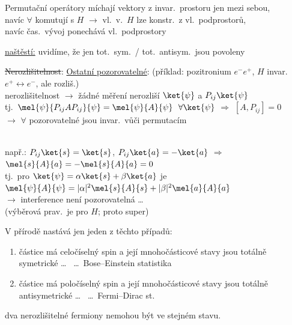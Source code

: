 Permutační operátory míchají vektory z invar.\ prostoru jen mezi sebou, \\
navíc $\forall$ komutují s $H$ \quad $\to$ vl.\ v.\ $H$ lze konstr.\ z vl.\ podprostorů, \\
\hspace*{5.5cm} navíc čas.\ vývoj ponechává vl.\ podprostory

\underline{naštěstí:} uvidíme, že jen tot.\ sym.\ / tot.\ antisym.\ jsou povoleny

\sout{Nerozlišitelnost}: \underline{Ostatní pozorovatelné}: \quad
(příklad: pozitronium $e^-e^+$, $H$ invar.\ $e^+\leftrightarrow e^-$, ale rozliš.) \\
nerozlišitelnost $\to$ žádné měření nerozliší $\ket{\psi}$ a $P_{ij}\ket{\psi}$ \\
\quad tj.\ \quad $\mel{\psi}{P_{ij}AP_{ij}}{\psi} = \mel{\psi}{A}{\psi}\ \ \forall\ket{\psi}$ \quad $\Rightarrow$ \quad $[A,P_{ij}] = 0$ \\
$\to$ $\forall$ pozorovatelné jsou invar.\ vůči permutacím

 \\
např.: \quad $P_{ij}\ket{s} = \ket{s}$, \quad $P_{ij}\ket{a} = -\ket{a}$ \quad $\Rightarrow$ \quad $\mel{s}{A}{a} = -\mel{s}{A}{a} = 0$ \\
\quad tj.\ pro $\ket{\psi} = \alpha\ket{s} + \beta\ket{a}$ je $\mel{\psi}{A}{\psi} = |\alpha|^2\mel{s}{A}{s} + |\beta|^2\mel{a}{A}{a}$ \\
$\to$ interference není pozorovatelná \quad \dots\  \\
\hspace*{6cm} (výběrová prav.\ je pro $H$; proto super)

\begin{veta}
V přírodě nastává jen jeden z těchto případů:
\begin{enumerate}[label=(\alph*)]
  \item částice má celočíselný spin a její mnohočásticové stavy jsou totálně symetrické \dots\  \dots\ Bose--Einstein statistika
  \item částice má poločíselný spin a její mnohočásticové stavy jsou totálně antisymetrické \dots\  \dots\ Fermi--Dirac st.
\end{enumerate}
\end{veta}

\begin{veta}
dva nerozlišitelné fermiony nemohou být ve stejném stavu.
\end{veta}

